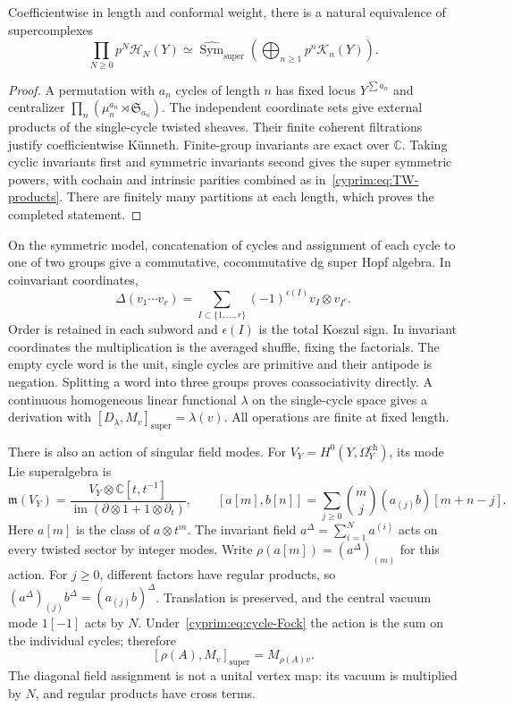 \begin{proposition}\label{cyprim:prop:cycle-decomposition}
Coefficientwise in length and conformal weight,
there is a natural equivalence of supercomplexes
\begin{equation}\label{cyprim:eq:cycle-Fock}
 \prod_{N\ge0}p^N\mathcal H_N(Y)
 \simeq\widehat{\operatorname{Sym}}_{\mathrm{super}}
       \left(\bigoplus_{n\ge1}p^n\mathcal K_n(Y)\right).
\end{equation}
\end{proposition}

\begin{proof}
A permutation with $a_n$ cycles of length $n$ has
fixed locus $Y^{\sum a_n}$ and centralizer
$\prod_n(\mu_n^{a_n}\rtimes\mathfrak S_{a_n})$.
The independent coordinate sets give external
products of the single-cycle twisted sheaves.
Their finite coherent filtrations justify
coefficientwise K\"unneth. Finite-group invariants
are exact over $\mathbb C$. Taking cyclic invariants
first and symmetric invariants second gives the
super symmetric powers, with cochain and intrinsic
parities combined as in~\eqref{cyprim:eq:TW-products}.
There are finitely many partitions at each length,
which proves the completed statement.
\end{proof}

On the symmetric model, concatenation of cycles
and assignment of each cycle to one of two groups
give a commutative, cocommutative dg super Hopf
algebra. In coinvariant coordinates,
\[
 \Delta(v_1\cdots v_r)=\sum_{I\subset\{1,\ldots,r\}}
 (-1)^{\epsilon(I)}v_I\otimes v_{I^c}.
\]
Order is retained in each subword and $\epsilon(I)$
is the total Koszul sign. In invariant coordinates
the multiplication is the averaged shuffle, fixing
the factorials. The empty cycle word is the unit,
single cycles are primitive and their antipode is
negation. Splitting a word into three groups proves
coassociativity directly. A continuous homogeneous
linear functional $\lambda$ on the single-cycle
space gives a derivation with
$[D_\lambda,M_v]_{\mathrm{super}}=\lambda(v)$.
All operations are finite at fixed length.

There is also an action of singular field modes.
For $V_Y=H^0(Y,\Omega_Y^{\mathrm{ch}})$, its mode
Lie superalgebra is
\[
 \mathfrak m(V_Y)=
 \frac{V_Y\otimes\mathbb C[t,t^{-1}]}
 {\operatorname{im}(\partial\otimes1+1\otimes\partial_t)},
 \qquad
 [a[m],b[n]]=
 \sum_{j\ge0}\binom mj(a_{(j)}b)[m+n-j].
\]
Here $a[m]$ is the class of $a\otimes t^m$.
The invariant field $a^\Delta=\sum_{i=1}^Na^{(i)}$
acts on every twisted sector by integer modes.
Write $\rho(a[m])=(a^\Delta)_{(m)}$ for this action.
For $j\ge0$, different factors have regular
products, so
$(a^\Delta)_{(j)}b^\Delta=(a_{(j)}b)^\Delta$.
Translation is preserved, and the central vacuum
mode $1[-1]$ acts by $N$. Under~\eqref{cyprim:eq:cycle-Fock}
the action is the sum on the individual cycles;
therefore
\begin{equation}\label{cyprim:eq:mode-creator}
 [\rho(A),M_v]_{\mathrm{super}}=M_{\rho(A)v}.
\end{equation}
The diagonal field assignment is not a unital
vertex map: its vacuum is multiplied by $N$,
and regular products have cross terms.

